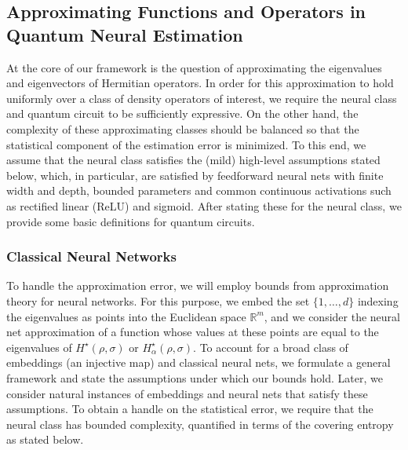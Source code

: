 \documentclass[a4paper,onecolumn,11pt,accepted=2026-05-12]{quantumarticle}
\newcommand{\RR}{\mathbb{R}}
\begin{document}
\subsection{Approximating Functions and Operators in Quantum Neural Estimation}\label{Sec:approxfunc-op}
At the core of our framework is the question of approximating the eigenvalues and eigenvectors of Hermitian operators. In order for this approximation to hold uniformly over a class of density operators of interest, we require the neural class and quantum circuit to be sufficiently expressive. On the other hand, the complexity of these approximating classes should be balanced so that the statistical component of the estimation error is minimized. To this end, we assume that the neural class satisfies the (mild) high-level assumptions stated below, which, in particular, are satisfied by feedforward neural nets with finite width and depth, bounded parameters and common continuous activations such as rectified linear (ReLU) and sigmoid. After stating these for the neural class, we provide some basic definitions for quantum circuits. 
\subsubsection{Classical Neural Networks}
To handle the approximation error, we will employ bounds from approximation theory for neural networks. For this purpose, we  embed the set $\{1,\ldots,d\}$ indexing the eigenvalues  as points into the Euclidean space $\RR^{m}$, and we consider the neural net approximation of a function whose values at these points are equal to the eigenvalues of $H^{\star}(\rho,\sigma)$ or $H_{\alpha}^{\star}(\rho,\sigma)$. To account for a broad class of embeddings (an injective map) and classical neural nets, we formulate a general framework and state the assumptions  under which our bounds hold. Later, we consider natural instances of embeddings and neural nets that satisfy these assumptions. To obtain a handle on the statistical error, we require that the neural class  has bounded complexity, quantified in terms of the covering entropy as stated below.
\end{document}
